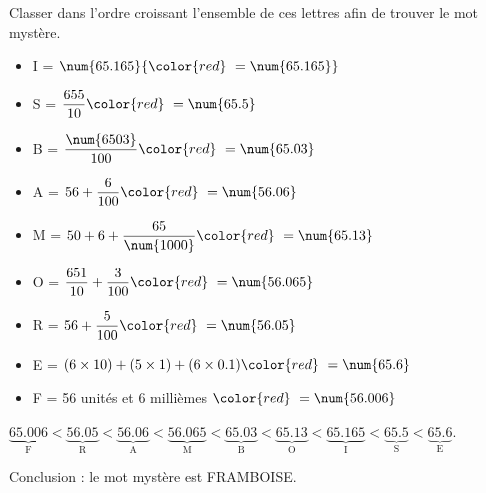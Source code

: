     Classer dans l'ordre croissant l'ensemble de ces lettres afin de trouver le mot mystère.
    \begin{spacing}{2}
        \begin{itemize}
            \item I = $\num{65.165}                  {\color{red} ~= \num{65.165}}$
            \item S = $\dfrac{655}{10}               {\color{red} ~= \num{65.5}  }$
            \item B = $\dfrac{\num{6503}}{100}       {\color{red} ~= \num{65.03} }$
            \item A = $56+\dfrac{6}{100}             {\color{red} ~= \num{56.06} }$
            \item M = $50+6+\dfrac{65}{\num{1000}}   {\color{red} ~= \num{65.13} }$
            \item O = $\dfrac{651}{10}+\dfrac{3}{100}{\color{red} ~= \num{56.065}}$
            \item R = $56+\dfrac{5}{100}             {\color{red} ~= \num{56.05} }$
            \item E = $(6\times10)+(5\times1)+(6\times0.1) {\color{red} ~= \num{65.6}  }$
            \item F = 56 unités et 6 millièmes ${\color{red} ~=            \num{56.006}}$
        \end{itemize}
    \end{spacing}

    \medskip
    {\scriptsize $\underbrace{\num{65.006}}_\text{F} < \underbrace{\num{56.05}}_\text{R} < \underbrace{\num{56.06}}_\text{A} < \underbrace{\num{56.065}}_\text{M} < \underbrace{\num{65.03}}_\text{B} < \underbrace{\num{65.13}}_\text{O} < \underbrace{\num{65.165}}_\text{I} < \underbrace{\num{65.5}}_\text{S} < \underbrace{\num{65.6}}_\text{E}$}.

    \medskip
    Conclusion : le mot mystère est \red FRAMBOISE.
